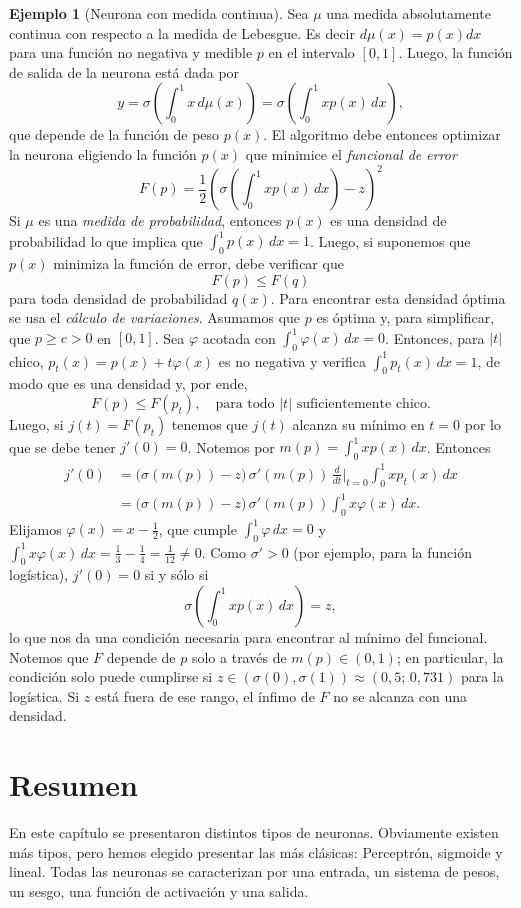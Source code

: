 \documentclass[12pt, a4paper]{amsbook}
\theoremstyle{remark}
\theoremstyle{definition}
\newtheorem{ejem}[teo]{Ejemplo}
\numberwithin{section}{chapter}
\numberwithin{subsection}{section}
\numberwithin{equation}{section}
\numberwithin{figure}{chapter}
\begin{document}
\begin{ejem}[Neurona con medida continua]
Sea $\mu$ una medida absolutamente continua con respecto a la medida de Lebesgue. Es decir $d\mu(x) = p(x)dx$ para una función no negativa y medible $p$ en el intervalo $[0,1]$. Luego, la función de salida de la neurona está dada por
$$
y=\sigma\left(\int_0^1 x\, d\mu(x)\right)=\sigma\left(\int_0^1 x p(x)\, dx\right),
$$
que depende de la función de peso $p(x)$. El algoritmo debe entonces optimizar la neurona eligiendo la función $p(x)$ que minimice el {\em funcional de error}
$$
F(p) = \frac12\left(\sigma\left(\int_0^1 x p(x)\, dx\right) - z\right)^2
$$
Si $\mu$ es una {\em medida de probabilidad}, entonces $p(x)$ es una densidad de probabilidad lo que implica que $\int_0^1 p(x)\, dx =1$. Luego, si suponemos que $p(x)$ minimiza la función de error, debe verificar que 
$$
F(p)\le F(q)
$$
para toda densidad de probabilidad $q(x)$. Para encontrar esta densidad óptima se usa el {\em cálculo de variaciones}. Asumamos que $p$ es óptima y, para simplificar, que $p\ge c>0$ en $[0,1]$. Sea $\varphi$ acotada con $\int_0^1\varphi(x)\, dx = 0$. Entonces, para $|t|$ chico, $p_t(x) = p(x) + t\varphi(x)$ es no negativa y verifica $\int_0^1 p_t(x)\, dx=1$, de modo que es una densidad y, por ende,
$$
F(p) \le F(p_t),\quad \text{para todo } |t| \text{ suficientemente chico.}
$$
Luego, si $j(t) = F(p_t)$ tenemos que $j(t)$ alcanza su mínimo en $t=0$ por lo que se debe tener $j'(0)=0$. Notemos por $m(p)=\int_0^1xp(x)\,dx$. Entonces
\begin{align*}
j'(0) &= \bigl(\sigma(m(p)) - z\bigr)\,\sigma'(m(p))\,\frac{d}{dt}\Big|_{t=0}\int_0^1 x p_t(x)\, dx\\
&=\bigl(\sigma(m(p)) - z\bigr)\,\sigma'(m(p))\int_0^1 x \varphi(x)\, dx.
\end{align*}
Elijamos $\varphi(x)=x-\tfrac12$, que cumple $\int_0^1\varphi\,dx=0$ y $\int_0^1x\varphi(x)\,dx=\tfrac13-\tfrac14=\tfrac1{12}\ne0$. Como $\sigma'>0$ (por ejemplo, para la función logística), $j'(0)=0$ si y sólo si
$$
\sigma\left(\int_0^1 x p(x)\, dx\right) = z,
$$
lo que nos da una condición necesaria para encontrar al mínimo del funcional. Notemos que $F$ depende de $p$ solo a través de $m(p)\in(0,1)$; en particular, la condición solo puede cumplirse si $z\in(\sigma(0),\sigma(1))\approx(0{,}5;\,0{,}731)$ para la logística. Si $z$ está fuera de ese rango, el ínfimo de $F$ no se alcanza con una densidad.
\end{ejem}

\section{Resumen}\label{sec.c5.7}
En este capítulo se presentaron distintos tipos de neuronas. Obviamente existen más tipos, pero hemos elegido presentar las más clásicas: Perceptrón, sigmoide y lineal. Todas las neuronas se caracterizan por una entrada, un sistema de pesos, un sesgo, una función de activación y una salida.
\end{document}
